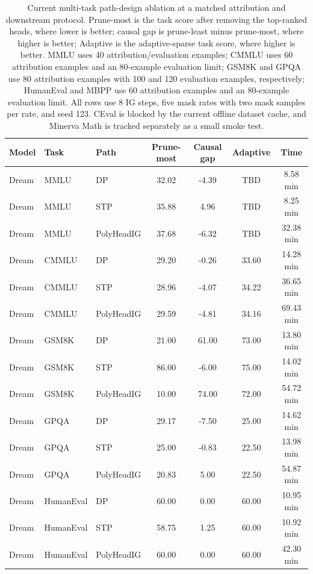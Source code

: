\begin{table}[t]
\centering
\caption{Current multi-task path-design ablation at a matched attribution and downstream protocol. Prune-most is the task score after removing the top-ranked heads, where lower is better; causal gap is prune-least minus prune-most, where higher is better; Adaptive is the adaptive-sparse task score, where higher is better. MMLU uses 40 attribution/evaluation examples; CMMLU uses 60 attribution examples and an 80-example evaluation limit; GSM8K and GPQA use 80 attribution examples with 100 and 120 evaluation examples, respectively; HumanEval and MBPP use 60 attribution examples and an 80-example evaluation limit. All rows use 8 IG steps, five mask rates with two mask samples per rate, and seed 123. CEval is blocked by the current offline dataset cache, and Minerva Math is tracked separately as a small smoke test.}
\label{tab:path_ablation}
\begin{tabular}{lllcccc}
\hline
\textbf{Model} & \textbf{Task} & \textbf{Path} & \textbf{Prune-most} & \textbf{Causal gap} & \textbf{Adaptive} & \textbf{Time} \\
\hline
Dream & MMLU & DP & 32.02 & -4.39 & TBD & 8.58 min \\
Dream & MMLU & STP & 35.88 & 4.96 & TBD & 8.25 min \\
Dream & MMLU & PolyHeadIG & 37.68 & -6.32 & TBD & 32.38 min \\
Dream & CMMLU & DP & 29.20 & -0.26 & 33.60 & 14.28 min \\
Dream & CMMLU & STP & 28.96 & -4.07 & 34.22 & 36.65 min \\
Dream & CMMLU & PolyHeadIG & 29.59 & -4.81 & 34.16 & 69.43 min \\
Dream & GSM8K & DP & 21.00 & 61.00 & 73.00 & 13.80 min \\
Dream & GSM8K & STP & 86.00 & -6.00 & 75.00 & 14.02 min \\
Dream & GSM8K & PolyHeadIG & 10.00 & 74.00 & 72.00 & 54.72 min \\
Dream & GPQA & DP & 29.17 & -7.50 & 25.00 & 14.62 min \\
Dream & GPQA & STP & 25.00 & -0.83 & 22.50 & 13.98 min \\
Dream & GPQA & PolyHeadIG & 20.83 & 5.00 & 22.50 & 54.87 min \\
Dream & HumanEval & DP & 60.00 & 0.00 & 60.00 & 10.95 min \\
Dream & HumanEval & STP & 58.75 & 1.25 & 60.00 & 10.92 min \\
Dream & HumanEval & PolyHeadIG & 60.00 & 0.00 & 60.00 & 42.30 min \\

\end{tabular}
\end{table}
